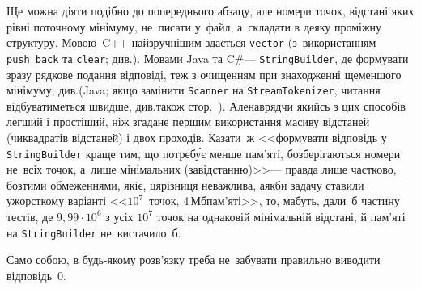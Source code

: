 Ще можна діяти подібно до попереднього абзацу, але номери точок, відстані яких рівні поточному мінімуму, не~писати у~файл, а~складати в деяку проміжну структуру. Мовою~C++ найзручнішим здається \texttt{vector} (з~використанням \verb"push_back" та \verb"clear"; див.\nolinebreak[2] ). Мовами Java та C\#\nolinebreak[3] --- \verb"StringBuilder", де формувати зразу рядкове подання відповіді, теж з очищенням при знаходженні ще\nolinebreak[3] меншого мінімуму; див.\nolinebreak[2] \nolinebreak[2] (Java; якщо замінити \verb"Scanner" на \verb"StreamTokenizer", читання відбуватиметься швидше, див.\nolinebreak[2] також стор.~\pageref{text:java-Scanner-versus-StreamTokenizer}). Але\nolinebreak[2]  навряд\nolinebreak[3] чи якийсь з цих способів легший і простіший, ніж згадане першим використання масиву відстаней (чи\nolinebreak[3] квадратів відстаней) і двох проходів. Казати~ж <<формувати відповідь у \verb"StringBuilder" краще тим, що потреб\'{у}є менше пам'яті, бо\nolinebreak[2] зберігаються номери не~всіх точок, а~лише мінімальних (за\nolinebreak[3] відстанню)>>\nolinebreak[3] --- правда лише частково, бо\nolinebreak[2] з\nolinebreak[3] тими обмеженнями, які\nolinebreak[3] є, ця\nolinebreak[2] різниця неважлива, а\nolinebreak[3] якби задачу ставили у\nolinebreak[2] жорсткому варіанті <<$10^7$~точок, 4$\,$Мб\nolinebreak[3] пам'яті>>, то, мабуть, дали~б частину тестів, де $9{,}99{\cdot}10^6$ з усіх $10^7$ точок на однаковій мінімальній відстані, й пам'яті на \verb"StringBuilder" не~вистачило~б.


Само собою, в будь-якому розв'язку треба не~забувати правильно виводити відповідь~0.

